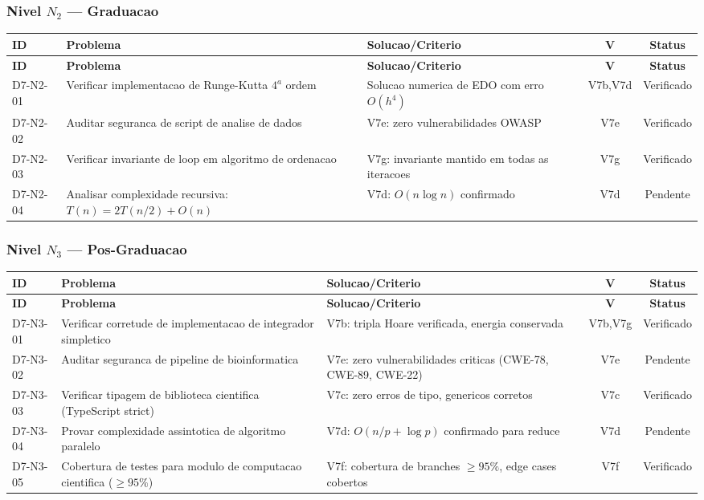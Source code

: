 \subsubsection{Nivel $N_2$ --- Graduacao}

\begin{longtable}{|p{2.0cm}|p{4.2cm}|p{4.2cm}|c|c|}
\hline
\textbf{ID} & \textbf{Problema} & \textbf{Solucao/Criterio} & \textbf{V} & \textbf{Status} \\
\hline
\endfirsthead
\hline
\textbf{ID} & \textbf{Problema} & \textbf{Solucao/Criterio} & \textbf{V} & \textbf{Status} \\
\hline
\endhead
\hline
\endfoot
D7-N2-01 & Verificar implementacao de Runge-Kutta $4^{a}$ ordem & Solucao numerica de EDO com erro $O(h^{4})$ & V7b,V7d & Verificado \\
\hline
D7-N2-02 & Auditar seguranca de script de analise de dados & V7e: zero vulnerabilidades OWASP & V7e & Verificado \\
\hline
D7-N2-03 & Verificar invariante de loop em algoritmo de ordenacao & V7g: invariante mantido em todas as iteracoes & V7g & Verificado \\
\hline
D7-N2-04 & Analisar complexidade recursiva: $T(n)=2T(n/2)+O(n)$ & V7d: $O(n\log n)$ confirmado & V7d & Pendente \\
\hline
\end{longtable}

\subsubsection{Nivel $N_3$ --- Pos-Graduacao}

\begin{longtable}{|p{2.0cm}|p{4.2cm}|p{4.2cm}|c|c|}
\hline
\textbf{ID} & \textbf{Problema} & \textbf{Solucao/Criterio} & \textbf{V} & \textbf{Status} \\
\hline
\endfirsthead
\hline
\textbf{ID} & \textbf{Problema} & \textbf{Solucao/Criterio} & \textbf{V} & \textbf{Status} \\
\hline
\endhead
\hline
\endfoot
D7-N3-01 & Verificar corretude de implementacao de integrador simpletico & V7b: tripla Hoare verificada, energia conservada & V7b,V7g & Verificado \\
\hline
D7-N3-02 & Auditar seguranca de pipeline de bioinformatica & V7e: zero vulnerabilidades criticas (CWE-78, CWE-89, CWE-22) & V7e & Pendente \\
\hline
D7-N3-03 & Verificar tipagem de biblioteca cientifica (TypeScript strict) & V7c: zero erros de tipo, genericos corretos & V7c & Verificado \\
\hline
D7-N3-04 & Provar complexidade assintotica de algoritmo paralelo & V7d: $O(n/p+\log p)$ confirmado para reduce & V7d & Pendente \\
\hline
D7-N3-05 & Cobertura de testes para modulo de computacao cientifica ($\geq 95\%$) & V7f: cobertura de branches $\geq 95\%$, edge cases cobertos & V7f & Verificado \\
\hline
\end{longtable}

